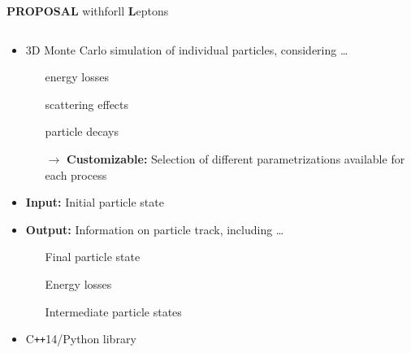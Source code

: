 \begin{frame}{}
  \vspace{-3cm}
  \begin{minipage}[t][1cm][t]{\textwidth}
  {\huge \textbf{PROPOSAL}} {\huge\textbf{\rightarrow}}
  \colorbox{tugreen}{}{\Large with}\colorbox{tugreen}{}{\Large for}\colorbox{tugreen}{ll {\huge \textbf{L}}{\Large eptons}}
  \end{minipage}
  \begin{minipage}[t][1cm][t]{\textwidth}
  \vspace{-5mm}
    \begin{columns}[onlytextwidth]
        \begin{column}{0.5\textwidth}
            \begin{itemize}
              \item 3D Monte Carlo simulation of individual particles, considering \ldots
              \begin{itemize}
                \item[\normalcolor{\ldots}] energy losses
                \item[\normalcolor{\ldots}] scattering effects
                \item[\normalcolor{\ldots}] particle decays
                \item[$\rightarrow$] \textbf{Customizable:} Selection of different parametrizations available for each process
              \end{itemize}
              \item \textbf{Input:} Initial particle state
              \item \textbf{Output:} Information on particle track, including \ldots
              \begin{itemize}
                \item[\normalcolor{\ldots}] Final particle state
                \item[\normalcolor{\ldots}] Energy losses
                \item[\normalcolor{\ldots}] Intermediate particle states
              \end{itemize}
              \item C\texttt{++}14/Python library

\end{itemize}
\end{column}
\end{columns}
\end{minipage}
\end{frame}
